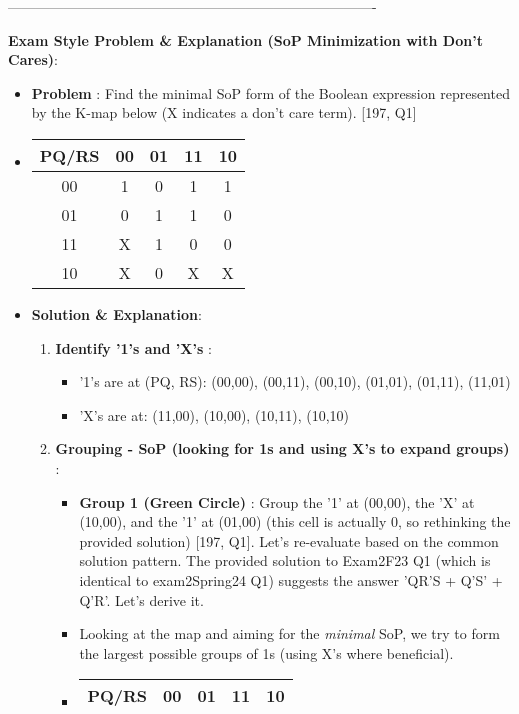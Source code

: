 \documentclass{article}
\begin{document}
\begin{itemize}
\-------------------------------------------------------------------------------- 

\textbf{Exam Style Problem \& Explanation (SoP Minimization with Don't Cares)}:

\begin{itemize}
    \item \textbf{Problem} : Find the minimal SoP form of the Boolean expression represented by the K-map below (X indicates a don't care term). [197, Q1]
    \item \begin{tabular}{|c|c|c|c|c|} \\ \hline
PQ/RS & 00 & 01 & 11 & 10 \\ \hline

 00 & 1 & 0 & 1 & 1 \\ 01 & 0 & 1 & 1 & 0 \\ 11 & X & 1 & 0 & 0 \\ 10 & X & 0 & X & X \\ \hline

\end{tabular}


    \item \textbf{Solution \& Explanation}:
    \begin{enumerate}
        \item \textbf{Identify '1's and 'X's} :
        \begin{itemize}
            \item '1's are at (PQ, RS): (00,00), (00,11), (00,10), (01,01), (01,11), (11,01)
            \item 'X's are at: (11,00), (10,00), (10,11), (10,10)
        \end{itemize}
        \item \textbf{Grouping - SoP (looking for 1s and using X's to expand groups)} :
        \begin{itemize}
            \item \textbf{Group 1 (Green Circle)} : Group the '1' at (00,00), the 'X' at (10,00), and the '1' at (01,00) (this cell is actually 0, so rethinking the provided solution) [197, Q1]. Let's re-evaluate based on the common solution pattern. The provided solution to Exam2F23 Q1 (which is identical to exam2Spring24 Q1) suggests the answer 'QR'S + Q'S' + Q'R'. Let's derive it.
            \item Looking at the map and aiming for the \textit{minimal} SoP, we try to form the largest possible groups of 1s (using X's where beneficial).
            \item \begin{tabular}{|c|c|c|c|c|} \\ \hline
PQ/RS & 00 & 01 & 11 & 10 \\ \hline


\end{tabular}
\end{itemize}
\end{enumerate}
\end{itemize}
\end{itemize}
\end{document}
